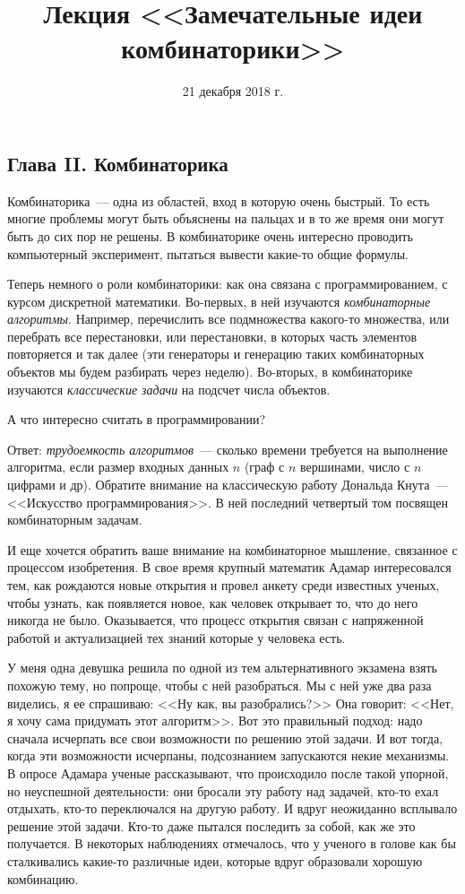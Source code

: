\documentclass[russian]{lecture-notes}
\title{Лекция <<Замечательные идеи комбинаторики>>}
\date{21 декабря 2018 г.}
\theoremstyle{definition}
\begin{document}
	\maketitle
	
	\begin{center}
		\section*{\LARGE Глава II. Комбинаторика}
		\label{glav:komb}
	\end{center}

	Комбинаторика~--- одна из областей, вход в которую очень быстрый. То есть многие проблемы могут быть объяснены на пальцах и в то же время они могут быть до сих пор не решены. В комбинаторике очень интересно проводить компьютерный эксперимент, пытаться вывести какие-то общие формулы.
	
	Теперь немного о роли комбинаторики: как она связана с программированием, с курсом дискретной математики. Во-первых, в ней изучаются \emph{комбинаторные алгоритмы}. Например, перечислить все подмножества какого-то множества, или перебрать все перестановки, или перестановки, в которых часть элементов повторяется и так далее (эти генераторы и генерацию таких комбинаторных объектов мы будем разбирать через неделю). Во-вторых, в комбинаторике изучаются \emph{классические задачи} на подсчет числа объектов. 
	
	А что интересно считать в программировании?
	
	Ответ: \emph{трудоемкость алгоритмов}~--- сколько времени требуется на выполнение алгоритма, если размер входных данных $n$ (граф с $n$ вершинами, число с $n$ цифрами и др). Обратите внимание на классическую работу Дональда Кнута~--- <<Искусство программирования>>. В ней последний четвертый том посвящен комбинаторным задачам. 
	
	И еще хочется обратить ваше внимание на комбинаторное мышление, связанное с процессом изобретения. В свое время крупный математик Адамар интересовался тем, как рождаются новые открытия и провел анкету среди известных ученых, чтобы узнать, как появляется новое, как человек открывает то, что до него никогда не было. Оказывается, что процесс открытия связан с напряженной работой и актуализацией тех знаний которые у человека есть.
	
	У меня одна девушка решила по одной из тем альтернативного экзамена взять похожую тему, но попроще, чтобы с ней разобраться. Мы с ней уже два раза виделись, я ее спрашиваю: <<Ну как, вы разобрались?>> Она говорит: <<Нет, я хочу сама придумать этот алгоритм>>. Вот это правильный подход: надо сначала исчерпать все свои возможности по решению этой задачи. И вот тогда, когда эти возможности исчерпаны, подсознанием запускаются некие механизмы. В опросе Адамара ученые рассказывают, что происходило после такой упорной, но неуспешной деятельности: они бросали эту работу над задачей, кто-то ехал отдыхать, кто-то переключался на другую работу. И вдруг неожиданно всплывало решение этой задачи. Кто-то даже пытался последить за собой, как же это получается. В некоторых наблюдениях отмечалось, что у ученого в голове как бы сталкивались какие-то различные идеи, которые вдруг образовали хорошую комбинацию.
	
\end{document}
